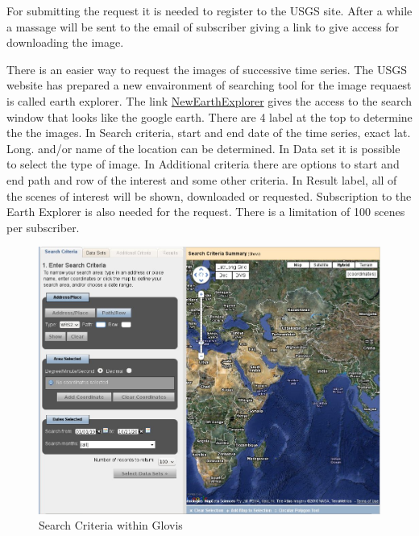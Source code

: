 For submitting the request it is needed to register to the USGS site. After a while a massage will be sent to the email of subscriber giving a link to give access for downloading the image.\newline

There is an easier way to request the images of successive time series. The USGS website has prepared a new envaironment of searching tool for the image requaest is called earth explorer. The link \href{http://edcsns17.cr.usgs.gov/NewEarthExplorer}{NewEarthExplorer} gives the access to the search window that looks like the google earth. There are 4 label at the top to determine the the images. In Search criteria, start and end date of the time series, exact lat. Long. and/or name of the location can be determined. In Data set it is possible to select the type of image. In Additional criteria there are options to  start and end path and row of the interest and some other criteria. In Result label, all of the scenes of interest will be shown, downloaded or requested. Subscription to the Earth Explorer is also needed for the request. There is  a limitation of 100 scenes per subscriber.\newline

\begin{figure}[htbp]
   \centering
   \includegraphics[scale=0.3]{gipe003.png}
   \caption{Search Criteria within Glovis}
   \label{fig:gipe003}
\end{figure}

